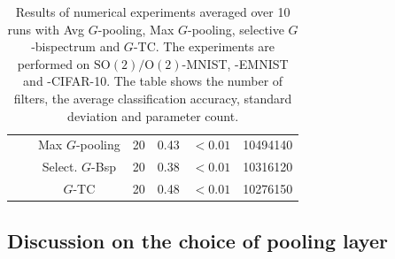 \documentclass{article}
\theoremstyle{plain}
\theoremstyle{definition}
\theoremstyle{remark}
\begin{document}
\begin{table}[ht]
\begin{tabular}{||c|c|c|c|c|c|c||}
	     &              &Max $G$-pooling&20& 0.43& $<0.01$ &10494140\\
	     &              &Select. $G$-Bsp&20&0.38 &$<0.01$  &10316120\\
	     &              &$G$-TC&20&0.48 & $<0.01$ &10276150\\
	     \hline
\end{tabular}
\caption{Results of numerical experiments averaged over 10 runs with Avg $G$-pooling, Max $G$-pooling, selective $G$-bispectrum and $G$-TC. The experiments are performed on $\mathrm{SO}(2)/\mathrm{O}(2)$-MNIST, -EMNIST and -CIFAR-10. The table shows the number of filters, the average classification accuracy, standard deviation and parameter count.}
\label{tab:classification}
\end{table}
\subsection{Discussion on the choice of pooling layer}
\end{document}
